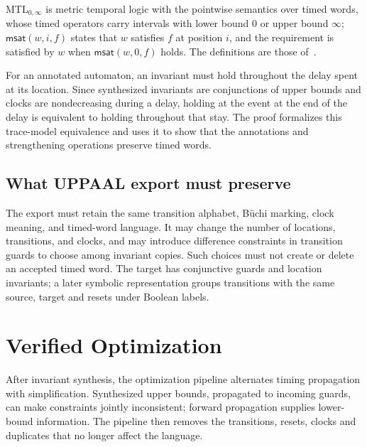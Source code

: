 \documentclass[preprint,12pt]{elsarticle}
\begin{document}
MTL$_{0,\infty}$ is metric temporal logic with the pointwise semantics over timed words, whose timed operators carry intervals with lower bound $0$ or upper bound $\infty$; $\mathsf{msat}(w,i,f)$ states that $w$ satisfies $f$ at position $i$, and the requirement is satisfied by $w$ when $\mathsf{msat}(w,0,f)$ holds. The definitions are those of~\cite{faresmtl}.

For an annotated automaton, an invariant must hold throughout the delay spent at its location. Since synthesized invariants are conjunctions of upper bounds and clocks are nondecreasing during a delay, holding at the event at the end of the delay is equivalent to holding throughout that stay. The proof formalizes this trace-model equivalence and uses it to show that the annotations and strengthening operations preserve timed words.

\subsection{What UPPAAL export must preserve}
\label{sec:export-contract}
The export must retain the same transition alphabet, B\"uchi marking, clock meaning, and timed-word language. It may change the number of locations, transitions, and clocks, and may introduce difference constraints in transition guards to choose among invariant copies. Such choices must not create or delete an accepted timed word. The target has conjunctive guards and location invariants; a later symbolic representation groups transitions with the same source, target and resets under Boolean labels.

\section{Verified Optimization}
\label{sec:post}
After invariant synthesis, the optimization pipeline alternates timing propagation with simplification. Synthesized upper bounds, propagated to incoming guards, can make constraints jointly inconsistent; forward propagation supplies lower-bound information. The pipeline then removes the transitions, resets, clocks and duplicates that no longer affect the language.
\end{document}
